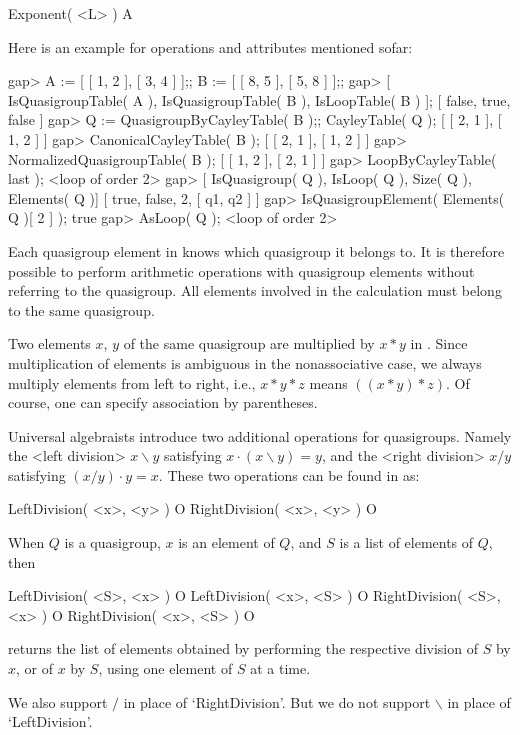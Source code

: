 \>Exponent( <L> ) A

Here is an example for operations and attributes mentioned sofar:

\beginexample
gap> A := [ [ 1, 2 ], [ 3, 4 ] ];; B := [ [ 8, 5 ], [ 5, 8 ] ];;
gap> [ IsQuasigroupTable( A ), IsQuasigroupTable( B ), IsLoopTable( B ) ];
[ false, true, false ]
gap> Q := QuasigroupByCayleyTable( B );; CayleyTable( Q );
[ [ 2, 1 ], [ 1, 2 ] ]
gap> CanonicalCayleyTable( B );
[ [ 2, 1 ], [ 1, 2 ] ]
gap> NormalizedQuasigroupTable( B );
[ [ 1, 2 ], [ 2, 1 ] ]
gap> LoopByCayleyTable( last );
<loop of order 2>
gap> [ IsQuasigroup( Q ), IsLoop( Q ), Size( Q ), Elements( Q )]
[ true, false, 2, [ q1, q2 ] ]
gap> IsQuasigroupElement( Elements( Q )[ 2 ] );
true
gap> AsLoop( Q );
<loop of order 2>
\endexample


Each quasigroup element in {\GAP} knows which quasigroup it belongs to. It is
therefore possible to perform arithmetic operations with quasigroup elements
without referring to the quasigroup. All elements involved in the calculation
must belong to the same quasigroup.

Two elements $x$, $y$ of the same quasigroup are multiplied by $x*y$ in {\GAP}.
Since multiplication of elements is ambiguous in the nonassociative case, we
always multiply elements from left to right, i.e., $x*y*z$ means $((x*y)*z)$.
Of course, one can specify association by parentheses.

Universal algebraists introduce two additional operations for quasigroups.
Namely the <left division>
%
%
 $x\backslash y$ satisfying $x\cdot(x\backslash
y)=y$, and the <right division>
%
%
 $x/y$ satisfying $(x/y)\cdot y=x$. These
two operations can be found in {\LOOPS} as:

\>LeftDivision( <x>, <y> ) O
\>RightDivision( <x>, <y> ) O

When $Q$ is a quasigroup, $x$ is an element of $Q$, and $S$ is a list of
elements of $Q$, then

\>LeftDivision( <S>, <x> ) O
\>LeftDivision( <x>, <S> ) O
\>RightDivision( <S>, <x> ) O
\>RightDivision( <x>, <S> ) O

returns the list of elements obtained by performing the respective
division of $S$ by $x$, or of $x$ by $S$, using one element of $S$ at a time.

We also support $/$ in place of `RightDivision'. But we do not support
$\backslash$ in place of `LeftDivision'.

